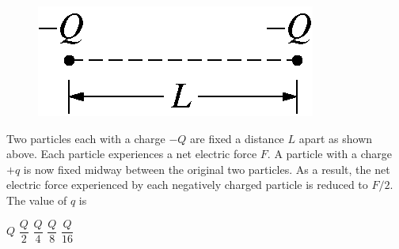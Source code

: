 \begin{figure}[H]
    \center
    \includegraphics[scale=0.25]{images/img-007-015.png}
\end{figure}

\begin{questions}\setcounter{question}{17}\question
Two particles each with a charge $-Q$ are fixed a distance $L$ apart as shown above. Each particle experiences a net electric force $F$. A particle with a charge $+q$ is now fixed midway between the original two particles. As a result, the net electric force experienced by each negatively charged particle is reduced to $F / 2$. The value of $q$ is

\begin{oneparchoices}
\choice $Q$
\choice $\dfrac{Q}{2} $
\choice $\dfrac{Q}{4} $
\choice $\dfrac{Q}{8} $
\choice $\dfrac{Q}{16}$
\end{oneparchoices}\end{questions}

